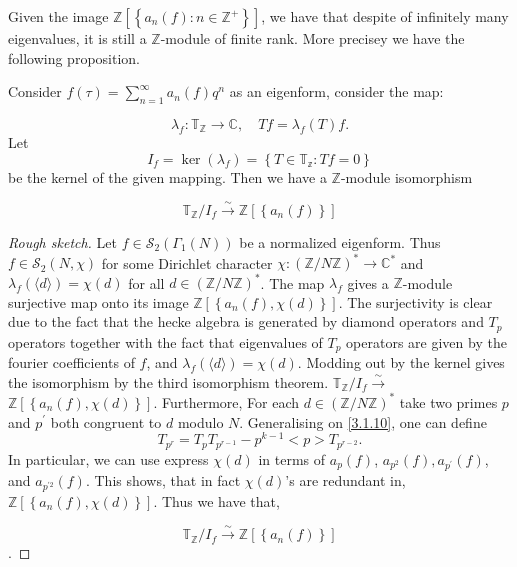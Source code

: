 Given the image $\mathbb{Z}\left[\left\{a_{n}(f): n \in \mathbb{Z}^{+}\right\}\right]$, we have that despite of infinitely many eigenvalues, it is still a $\mathbb{Z}$-module of finite rank. More precisey we have the following proposition. 


\begin{proposition}
Consider $f(\tau)=\sum_{n=1}^{\infty} a_{n}(f) q^{n}$ as an eigenform, consider the map:

$$
\lambda_{f}: \mathbb{T}_{\mathbb{Z}} \longrightarrow \mathbb{C}, \quad T f=\lambda_{f}(T) f.
$$
Let
$$
I_{f}=\operatorname{ker}\left(\lambda_{f}\right)=\left\{T \in \mathbb{T}_{\mathbb{z}}: T f=0\right\}
$$ be the kernel of the given mapping.  Then we have a $\mathbb{Z}$-module isomorphism 

$$
\mathbb{T}_{\mathbb{Z}} / I_{f} \stackrel{\sim}{\longrightarrow} \mathbb{Z}\left[\left\{a_{n}(f)\right\}\right]
$$
    
\end{proposition}
\begin{proof}[Rough sketch]
Let $f \in \mathcal{S}_{2}\left(\Gamma_{1}(N)\right)$ be a normalized eigenform. Thus $f \in \mathcal{S}_{2}(N, \chi)$ for some Dirichlet character $\chi:(\mathbb{Z} / N \mathbb{Z})^{*} \longrightarrow \mathbb{C}^{*}$ and $\lambda_{f}(\langle d\rangle)=\chi(d)$ for all $d \in(\mathbb{Z} / N \mathbb{Z})^{*}$. The map $\lambda_f$ gives a $\mathbb{Z}$-module surjective map onto its image $\mathbb{Z}\left[\left\{a_{n}(f), \chi(d)\right\}\right]$. The surjectivity is clear due to the fact that the hecke algebra is generated by diamond operators and $T_p$ operators together with the fact that eigenvalues of $T_p$ operators are given by the fourier coefficients of $f$, and $\lambda_{f}(\langle d\rangle)=\chi(d).$ Modding out by the kernel gives the isomorphism by the third isomorphism theorem. $\mathbb{T}_{\mathbb{Z}} / I_{f} \stackrel{\sim}{\longrightarrow}$ $\mathbb{Z}\left[\left\{a_{n}(f), \chi(d)\right\}\right]$. Furthermore, For each $d \in(\mathbb{Z} / N \mathbb{Z})^{*}$ take two primes $p$ and $p^{\prime}$ both congruent to $d$ modulo $N$. Generalising on \ref{3.1.10}, one can define $$ 
T_{p^r}=T_{p}T_{p^{r-1}}-p^{k-1}<p>T_{p^{r-2}}.
$$
In particular, we can use express $\chi(d)$ in terms of $a_{p}(f)$, $a_{p^{2}}(f), a_{p^{\prime}}(f)$, and $a_{p^{\prime 2}}(f)$. This shows, that in fact $\chi(d)$'s are redundant in, $\mathbb{Z}\left[\left\{a_{n}(f), \chi(d)\right\}\right]$. Thus we have that,

$$\mathbb{T}_{\mathbb{Z}} / I_{f} \stackrel{\sim}{\longrightarrow}\mathbb{Z}\left[\left\{a_{n}(f)\right\}\right]$$.
    
\end{proof}

